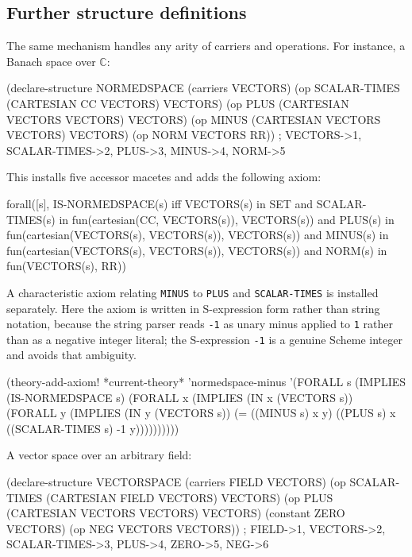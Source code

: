 

\subsection{Further structure definitions}

The same mechanism handles any arity of carriers and operations.  For
instance, a Banach space over $\mathbb{C}$:

\begin{VNBcode}
(declare-structure NORMEDSPACE
  (carriers VECTORS)
  (op SCALAR-TIMES (CARTESIAN CC VECTORS) VECTORS)
  (op PLUS         (CARTESIAN VECTORS VECTORS) VECTORS)
  (op MINUS        (CARTESIAN VECTORS VECTORS) VECTORS)
  (op NORM         VECTORS RR))
; VECTORS->1, SCALAR-TIMES->2, PLUS->3, MINUS->4, NORM->5
\end{VNBcode}

This installs five accessor macetes and adds the following axiom:
\begin{VNBsnip}
forall([s],
  IS-NORMEDSPACE(s) iff
    VECTORS(s) in SET
    and SCALAR-TIMES(s) in fun(cartesian(CC, VECTORS(s)), VECTORS(s))
    and PLUS(s) in fun(cartesian(VECTORS(s), VECTORS(s)), VECTORS(s))
    and MINUS(s) in fun(cartesian(VECTORS(s), VECTORS(s)), VECTORS(s))
    and NORM(s) in fun(VECTORS(s), RR))
\end{VNBsnip}

A characteristic axiom relating \texttt{MINUS} to \texttt{PLUS} and
\texttt{SCALAR-TIMES} is installed separately.  Here the axiom is written
in S-expression form rather than string notation, because the string
parser reads \texttt{-1} as unary minus applied to \texttt{1} rather than
as a negative integer literal; the S-expression \texttt{-1} is a genuine
Scheme integer and avoids that ambiguity.

\begin{VNBcode}
(theory-add-axiom! *current-theory* 'normedspace-minus
  '(FORALL s
     (IMPLIES (IS-NORMEDSPACE s)
       (FORALL x (IMPLIES (IN x (VECTORS s))
         (FORALL y (IMPLIES (IN y (VECTORS s))
           (= ((MINUS s) x y)
              ((PLUS s) x ((SCALAR-TIMES s) -1 y))))))))))
\end{VNBcode}

A vector space over an arbitrary field:
\begin{VNBcode}
(declare-structure VECTORSPACE
  (carriers FIELD VECTORS)
  (op SCALAR-TIMES (CARTESIAN FIELD VECTORS) VECTORS)
  (op PLUS         (CARTESIAN VECTORS VECTORS) VECTORS)
  (constant ZERO VECTORS)
  (op NEG          VECTORS VECTORS))
; FIELD->1, VECTORS->2, SCALAR-TIMES->3, PLUS->4, ZERO->5, NEG->6
\end{VNBcode}

